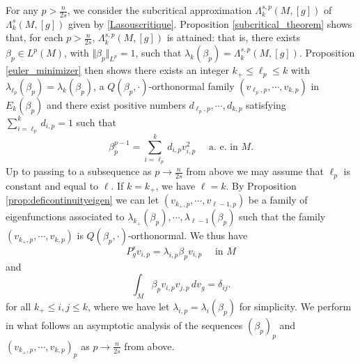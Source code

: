\documentclass[10pt]{amsart}
\numberwithin{equation}{section}
\def\La{{\Lambda}}
\theoremstyle{plain}
\theoremstyle{remark}
\begin{document}
For any $p > \frac{n}{2s}$, we consider the subcritical approximation $\La_k^{s,p}(M,[g])$ of $\La_k^s(M,[g])$ given by \eqref{Lasouscritique}. Proposition \ref{subcritical_theorem} shows that, for each $p > \frac{n}{2s}$, $\La_k^{s,p}(M,[g])$ is attained: that is, there exists $\beta_p \in L^p(M)$, with $\Vert \beta_p \Vert_{L^p} = 1$, such that $ \lambda_k(\beta_p) =  \La_k^{s,p}(M,[g])$. Proposition \ref{euler_minimizer} then shows there exists an integer $k_+ \le \ell_p \leq k$ with $\lambda_{\ell_p}(\beta_p) = \lambda_{k}(\beta_p)$, a $Q(\beta_p,\cdot)$-orthonormal family $(v_{\ell_p,p},\cdots,v_{k,p})$ in $E_k(\beta_p)$ and there exist positive numbers $d_{\ell_p,p} ,\cdots,d_{k,p}$ satisfying $\sum_{i=\ell_p}^k d_{i,p}  = 1$ such that 
\begin{equation} \label{mainthp:1}
  \beta_p^{p-1} = \sum_{i=\ell_p}^k d_{i,p} v_{i,p}^2 \quad \text{ a. e. in } M.
\end{equation}
Up to passing to a subsequence as $p \to \frac{n}{2s}$ from above we may assume that $\ell_p$ is constant and equal to $\ell$. If $k = k_+$, we have $\ell = k$. By Proposition \ref{prop:deficontinuityeigen} we can let $(v_{k_+,p}, \cdots, v_{\ell-1,p})$ be a family of eigenfunctions associated to $\lambda_{k_+}(\beta_p), \cdots, \lambda_{\ell-1}(\beta_p)$ such that the family $(v_{k_+,p}, \cdots, v_{k,p})$ is $Q(\beta_p,\cdot)$-orthonormal. We thus have 
\begin{equation}  \label{mainthp:2}
P_g^s v_{i,p} = \lambda_{i,p} \beta_p v_{i,p} \quad \text{ in } M 
\end{equation}
and 
\begin{equation} \label{mainthp:3}
\int_M \beta_p v_{i,p} v_{j,p} \,dv_g = \delta_{ij}. 
\end{equation}
for all $k_+ \le i,j \le k$, where we have let $\lambda_{i,p} = \lambda_i(\beta_p)$ for simplicity. We perform in what follows an asymptotic analysis of the sequences $(\beta_p)_p$ and $(v_{k_+,p}, \cdots, v_{k,p})_p$ as $p \to \frac{n}{2s}$ from above. 

\medskip
\end{document}
